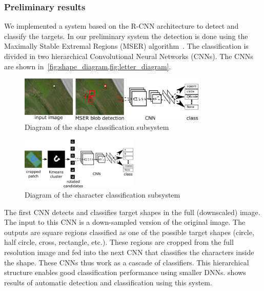 \documentclass{article} %
\begin{document}
\subsubsection{Preliminary results}
We implemented a system based on the R-CNN architecture to detect and classify
the targets. In our preliminary system the detection is done using the Maximally
Stable Extremal Regions (MSER) algorithm~\cite{Forssen2007}. The classification
is divided in two hierarchical Convolutional Neural Networks (CNNs). The CNNs are shown
in~\cref{fig:shape_diagram,fig:letter_diagram}.

\begin{figure}[h]
	\centering
	\includegraphics[width=0.8\textwidth]{diagram}
	\caption{Diagram of the shape classification subsystem}
	\label{fig:shape_diagram}
\end{figure}
\begin{figure}[h]
	\centering
	\includegraphics[width=0.5\textwidth]{letter_diagram}
	\caption{Diagram of the character classification subsystem}
	\label{fig:letter_diagram}
\end{figure}

The first CNN detects and classifies target shapes in the full (downscaled)
image. The input to this CNN is a down-sampled version of the original
image. The outputs are square regions classified as one of the possible target
shapes (circle, half circle, cross, rectangle, etc.). These regions are cropped
from the full resolution image and fed into the next CNN that classifies
the characters inside the shape. These CNNs thus work as a cascade of
classifiers. This hierarchical structure enables good classification
performance using smaller DNNs.  shows
results of automatic detection and classification using this system.
\end{document}

